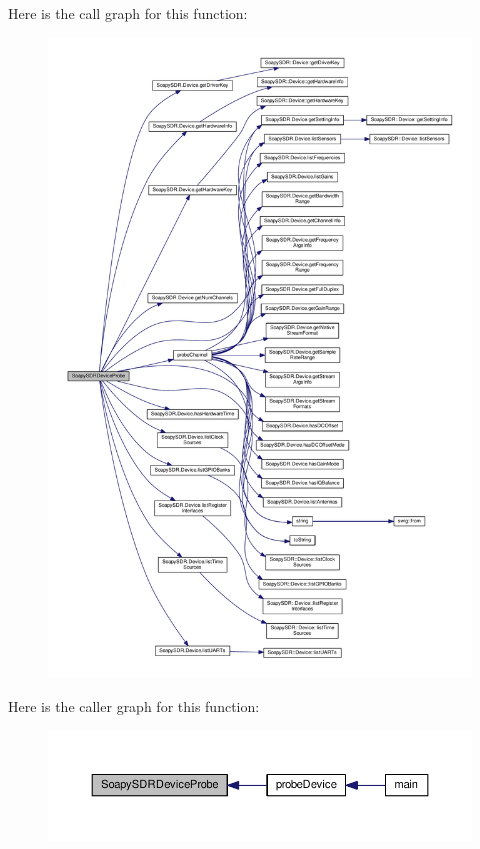 Here is the call graph for this function\+:
\nopagebreak
\begin{figure}[H]
\begin{center}
\leavevmode
\includegraphics[width=350pt]{db/da3/SoapySDRProbe_8cpp_a87971149b9ed797877076eb018517e87_cgraph}
\end{center}
\end{figure}




Here is the caller graph for this function\+:
\nopagebreak
\begin{figure}[H]
\begin{center}
\leavevmode
\includegraphics[width=350pt]{db/da3/SoapySDRProbe_8cpp_a87971149b9ed797877076eb018517e87_icgraph}
\end{center}
\end{figure}


